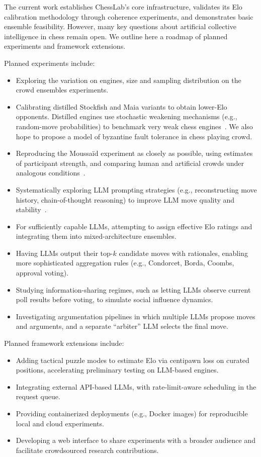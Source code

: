 \documentclass{article}
\begin{document}
The current work establishes ChessLab's core infrastructure, validates its Elo calibration methodology through coherence experiments, and demonstrates basic ensemble feasibility.
However, many key questions about artificial collective intelligence in chess remain open.
We outline here a roadmap of planned experiments and framework extensions.

Planned experiments include:
\begin{itemize}
  \item Exploring the variation on engines, size and sampling distribution on the crowd ensembles experiments.
  \item Calibrating distilled Stockfish and Maia variants to obtain lower-Elo opponents. Distilled engines use stochastic weakening mechanisms (e.g., random-move probabilities) to benchmark very weak chess engines~\cite{murphy2019}. We also hope to propose a model of byzantine fault tolerance in chess playing crowd.
  \item Reproducing the Moussaïd experiment as closely as possible, using estimates of participant strength, and comparing human and artificial crowds under analogous conditions~\cite{moussaid2025}.
  \item Systematically exploring LLM prompting strategies (e.g., reconstructing move history, chain-of-thought reasoning) to improve LLM move quality and stability~\cite{dynomight2024}.
  \item For sufficiently capable LLMs, attempting to assign effective Elo ratings and integrating them into mixed-architecture ensembles.
  \item Having LLMs output their top-\(k\) candidate moves with rationales, enabling more sophisticated aggregation rules (e.g., Condorcet, Borda, Coombs, approval voting).
  \item Studying information-sharing regimes, such as letting LLMs observe current poll results before voting, to simulate social influence dynamics.
  \item Investigating argumentation pipelines in which multiple LLMs propose moves and arguments, and a separate ``arbiter'' LLM selects the final move.
\end{itemize}

Planned framework extensions include:
\begin{itemize}
  \item Adding tactical puzzle modes to estimate Elo via centipawn loss on curated positions, accelerating preliminary testing on LLM-based engines.
  \item Integrating external API-based LLMs, with rate-limit-aware scheduling in the request queue.
  \item Providing containerized deployments (e.g., Docker images) for reproducible local and cloud experiments.
  \item Developing a web interface to share experiments with a broader audience and facilitate crowdsourced research contributions.
\end{itemize}
\end{document}
